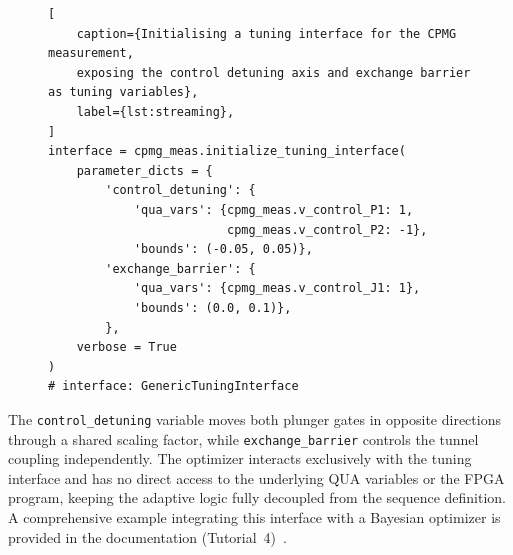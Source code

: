 \documentclass[numbers, preprint, twocolumn,10pt]{elsarticle}
\begin{document}
\begin{figure}[t]
\begin{lstlisting}[
    caption={Initialising a tuning interface for the CPMG measurement, 
    exposing the control detuning axis and exchange barrier as tuning variables},
    label={lst:streaming},
]
interface = cpmg_meas.initialize_tuning_interface(
    parameter_dicts = {
        'control_detuning': {
            'qua_vars': {cpmg_meas.v_control_P1: 1,
                         cpmg_meas.v_control_P2: -1},
            'bounds': (-0.05, 0.05)},
        'exchange_barrier': {
            'qua_vars': {cpmg_meas.v_control_J1: 1},
            'bounds': (0.0, 0.1)},
        },
    verbose = True
)
# interface: GenericTuningInterface
\end{lstlisting}
\end{figure}
The \texttt{control\_detuning} variable moves both plunger gates in opposite directions through a shared scaling factor, while \texttt{exchange\_barrier} controls the tunnel coupling independently. The optimizer interacts exclusively with the tuning interface and has no direct access to the underlying QUA variables or the FPGA program, keeping the adaptive logic fully decoupled from the sequence definition. A comprehensive example integrating this interface with a Bayesian optimizer is provided in the documentation (Tutorial~4)~\cite{arbok_tuts}.
\end{document}
